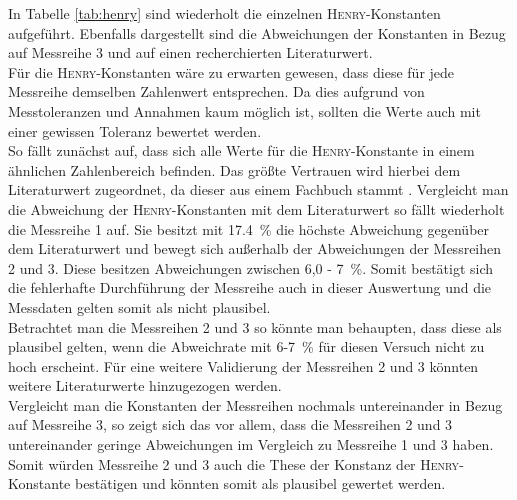 In Tabelle \ref{tab:henry} sind wiederholt die einzelnen \textsc{Henry}-Konstanten aufgeführt. Ebenfalls dargestellt sind die Abweichungen der Konstanten in Bezug auf Messreihe 3 und auf einen recherchierten Literaturwert.\\
Für die \textsc{Henry}-Konstanten wäre zu erwarten gewesen, dass diese für jede Messreihe demselben Zahlenwert entsprechen. Da dies aufgrund von Messtoleranzen und Annahmen kaum möglich ist, sollten die Werte auch mit einer gewissen Toleranz bewertet werden.\\
So fällt zunächst auf, dass sich alle Werte für die \textsc{Henry}-Konstante in einem ähnlichen Zahlenbereich befinden. Das größte Vertrauen wird hierbei dem Literaturwert zugeordnet, da dieser aus einem Fachbuch stammt \cite{Draxler.2014}. Vergleicht man die Abweichung der \textsc{Henry}-Konstanten mit dem Literaturwert so fällt wiederholt die Messreihe 1 auf. 
\newpage
Sie besitzt mit \SI{17,4}{\percent } die höchste Abweichung gegenüber dem Literaturwert und bewegt sich außerhalb der Abweichungen der Messreihen 2 und 3. 
Diese besitzen Abweichungen zwischen 6,0 - \SI{7}{\percent}. Somit bestätigt sich die fehlerhafte Durchführung der Messreihe auch in dieser Auswertung und die Messdaten gelten somit als nicht plausibel.\\
Betrachtet man die Messreihen 2 und 3 so könnte man behaupten, dass diese als plausibel gelten, wenn die Abweichrate mit 6-\SI{7}{\percent} für diesen Versuch nicht zu hoch erscheint. Für eine weitere Validierung der Messreihen 2 und 3 könnten weitere Literaturwerte hinzugezogen werden.\\
Vergleicht man die Konstanten der Messreihen nochmals untereinander in Bezug auf Messreihe 3, so zeigt sich das vor allem, dass die Messreihen 2 und 3 untereinander geringe Abweichungen im Vergleich zu Messreihe 1 und 3 haben. Somit würden Messreihe 2 und 3 auch die These der Konstanz der \textsc{Henry}-Konstante bestätigen und könnten somit als plausibel gewertet werden.\\

